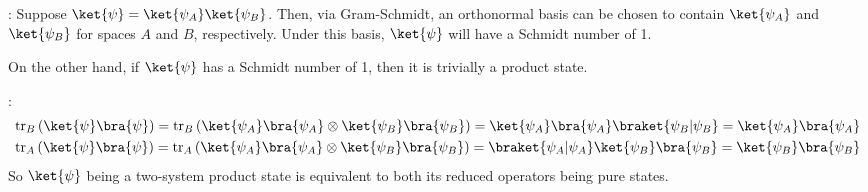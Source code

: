 \begingroup
\newcommand{\trA}[1]{\mathrm{tr}_A \left( #1 \right)}
\newcommand{\trB}[1]{\mathrm{tr}_B \left( #1 \right)}
\newcommand{\kb}[2]{\ket{#1} \bra{#2}}
%
\par {}:
%
Suppose $\ket{\psi} = \ket{\psi_A} \ket{\psi_B}$.
%
Then, via Gram-Schmidt, an orthonormal basis can be chosen  to contain $\ket{\psi_A}$ and $\ket{\psi_B}$ for spaces $A$ and $B$, respectively.
%
Under this basis, $\ket{\psi}$ will have a Schmidt number of 1.
%
\par On the other hand, if $\ket{\psi}$ has a Schmidt number of 1, then it is trivially a product state.
%
\par {}:
%
\begin{align*}
\trB{\kb{\psi}{\psi}} = \trB{\kb{\psi_A}{\psi_A} \otimes \kb{\psi_B}{\psi_B}} = \kb{\psi_A}{\psi_A} \braket{\psi_B|\psi_B} = \kb{\psi_A}{\psi_A} \\
\trA{\kb{\psi}{\psi}} = \trA{\kb{\psi_A}{\psi_A} \otimes \kb{\psi_B}{\psi_B}} = \braket{\psi_A|\psi_A} \kb{\psi_B}{\psi_B} = \kb{\psi_B}{\psi_B}
\end{align*}
%
So $\ket{\psi}$ being a two-system product state is equivalent to both its reduced operators being pure states.
\endgroup
